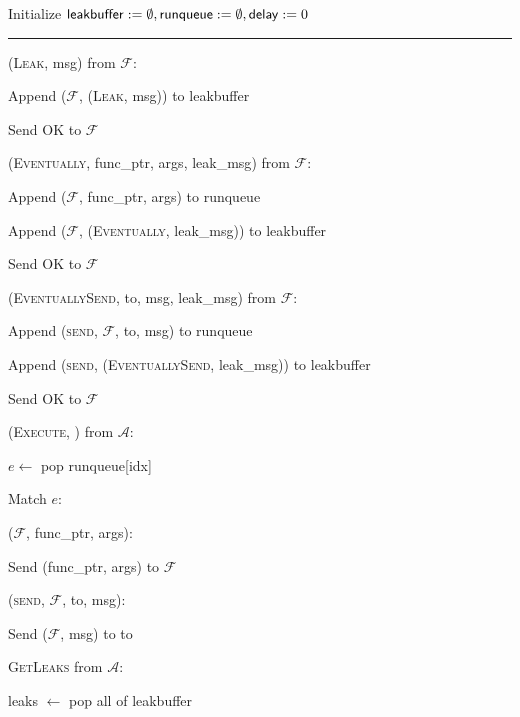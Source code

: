 \begin{bbox}[title={\textbf{Wrapper} $\mathcal{W}_{\msf{async}}$} ]

Initialize ${\mathsf {leakbuffer}} := \emptyset, {\mathsf {runqueue}} := \emptyset, {\mathsf {delay}} := 0$

\vspace{2mm} \hrule \vspace{2mm}

\OnInput (\textsc{Leak}, \textsf{msg}) from $\mathcal{F}$:

	\quad Append ($\mathcal{F}$, (\textsc{Leak}, \textsf{msg})) to \textsf{leakbuffer}
	
	\quad Send \textsc{OK} to $\mathcal{F}$


\OnInput (\textsc{Eventually}, \textsf{func\_ptr}, \textsf{args}, \textsf{leak\_msg}) from $\mathcal{F}$:

	\quad Append ($\mathcal{F}$, \textsf{func\_ptr}, \textsf{args}) to \textsf{runqueue}
	
	\quad Append ($\mathcal{F}$, (\textsc{Eventually}, \textsf{leak\_msg})) to \textsf{leakbuffer}
	
	\quad Send \textsc{OK} to $\mathcal{F}$

\OnInput (\textsc{EventuallySend}, \textsf{to}, \textsf{msg}, \textsf{leak\_msg}) from $\mathcal{F}$:
	
	\quad Append (\textsc{send}, $\mathcal{F}$, \textsf{to}, \textsf{msg}) to \textsf{runqueue}

	\quad Append (\textsc{send}, (\textsc{EventuallySend}, \textsf{leak\_msg})) to \textsf{leakbuffer}

	\quad Send \textsc{OK} to $\mathcal{F}$
	
\OnInput (\textsc{Execute}, ) from $\mathcal{A}$:

	\quad $e \leftarrow$ pop \textsf{runqueue[idx]}

	\quad Match $e$:

		\qquad ($\mathcal{F}$, \textsf{func\_ptr}, \textsf{args}):
	
		\qqquad Send (\textsf{func\_ptr}, \textsf{args}) to $\mathcal{F}$
	
		\qquad (\textsc{send}, $\mathcal{F}$, \textsf{to}, \textsf{msg}):
			
		\qqquad Send ($\mathcal{F}$, \textsf{msg}) to \textsf{to}
	
\OnInput \textsc{GetLeaks} from $\mathcal{A}$:

	\quad \textsf{leaks} $\leftarrow$ pop all of \textsf{leakbuffer}
	

\end{bbox}
